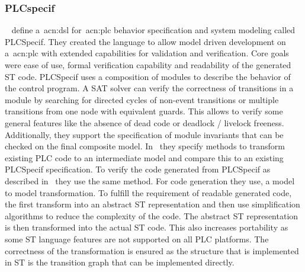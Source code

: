 \subsubsection{PLCspecif}
\label{sec:sub:plfspecif}

\citeauthor{7819191}~\cite{7819191, darvas2015syntax, darvas2015requirements, darvas2015formal, 10.1007/978-3-319-33693-0_32} define a~\acrshort{acn:dsl} for~\acrshort{acn:plc} behavior specification and system modeling called PLCSpecif.
They created the language to allow model driven development on a~\acrshort{acn:plc} with extended capabilities for validation and verification.
Core goals were ease of use, formal verification capability and readability of the generated ST code.
PLCSpecif uses a composition of modules to describe the behavior of the control program.
A SAT solver can verify the correctness of transitions in a module by searching for directed cycles of non-event transitions or multiple transitions from one node with equivalent guards.
This allows to verify some general features like the absence of dead code or deadlock / livelock freeness.
Additionally, they support the specification of module invariants that can be checked on the final composite model.
In~\cite{10.1007/978-3-319-33693-0_32} they specify methods to transform existing PLC code to an intermediate model and compare this to an existing PLCSpecif specification.
To verify the code generated from PLCSpecif as described in~\cite{7819191} they use the same method.
For code generation they use, a model to model transformation.
To fulfill the requirement of readable generated code, the first transform into an abstract ST representation and then use simplification algorithms to reduce the complexity of the code.
The abstract ST representation is then transformed into the actual ST code.
This also increases portability as some ST language features are not supported on all PLC platforms.
The correctness of the transformation is ensured as the structure that is implemented in ST is the transition graph that can be implemented directly.
